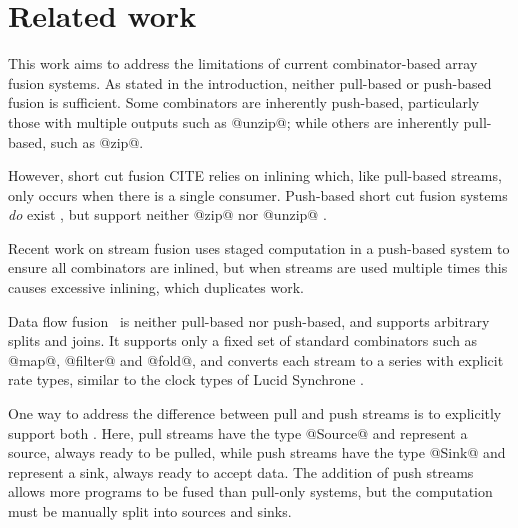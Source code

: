 \section{Related work}


This work aims to address the limitations of current combinator-based array fusion systems. As stated in the introduction, neither pull-based or push-based fusion is sufficient. Some combinators are inherently push-based, particularly those with multiple outputs such as @unzip@; while others are inherently pull-based, such as @zip@.


However, short cut fusion CITE relies on inlining which, like pull-based streams, only occurs when there is a single consumer. Push-based short cut fusion systems \emph{do} exist \cite{gill1993short}, but support neither @zip@ nor @unzip@ \cite{svenningsson2002shortcut,lippmeier2013data}.

Recent work on stream fusion \cite{kiselyov2016stream} uses staged computation in a push-based system to ensure all combinators are inlined, but when streams are used multiple times this causes excessive inlining, which duplicates work.


Data flow fusion~\cite{lippmeier2013data} is neither pull-based nor push-based, and supports arbitrary splits and joins. It supports only a fixed set of standard combinators such as @map@, @filter@ and @fold@, and converts each stream to a series with explicit rate types, similar to the clock types of Lucid Synchrone \cite{benveniste2003synchronous}.

One way to address the difference between pull and push streams is to explicitly support both \cite{bernardy2015duality, lippmeier2016polarized}. Here, pull streams have the type @Source@ and represent a source, always ready to be pulled, while push streams have the type @Sink@ and represent a sink, always ready to accept data. The addition of push streams allows more programs to be fused than pull-only systems, but the computation must be manually split into sources and sinks.


